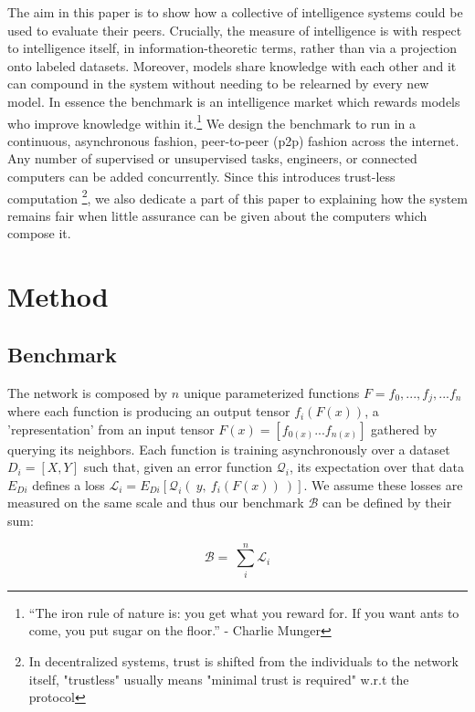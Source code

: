 \documentclass{article}
\begin{document}
The aim in this paper is to show how a collective of intelligence systems could be used to evaluate their peers. Crucially, the measure of intelligence is with respect to intelligence itself, in information-theoretic terms, rather than via a projection onto labeled datasets. Moreover, models share knowledge with each other and it can compound in the system without needing to be relearned by every new model. In essence the benchmark is an intelligence market which rewards models who improve knowledge within it.\footnote{“The iron rule of nature is: you get what you reward for. If you want ants to come, you put sugar on the floor.” - Charlie Munger} We design the benchmark to run in a continuous, asynchronous fashion, peer-to-peer (p2p) fashion across the internet. Any number of supervised or unsupervised tasks, engineers, or connected computers can be added concurrently. Since this introduces trust-less computation \footnote{ In decentralized systems, trust is shifted from the individuals to the network itself, "trustless" usually means "minimal trust is required" w.r.t the protocol}, we also dedicate a part of this paper to explaining how the system remains fair when little assurance can be given about the computers which compose it. 
\smallskip


\section{Method}

\subsection{Benchmark}

The network is composed by $n$ unique parameterized functions $F = {f_0, ...,  f_j, ...f_n}$ where each function is producing an output tensor $f_i(F(x))$, a 'representation' from an input tensor $F(x) = [f_{0(x)} ... f_{n(x)}]$ gathered by querying its neighbors. Each function is training asynchronously over a dataset $D_i=[X,Y]$ such that, given an error function $\mathcal{Q}_i$, its expectation over that data $E_{Di}$ defines a loss $\mathcal{L}_i = E_{Di}[\mathcal{Q}_i( \ y, \ f_i(F(x)) \ )]$. We assume these losses are measured on the same scale and thus our benchmark $\mathcal{B}$ can be defined by their sum:
\bigskip

\begin{equation}
\mathcal{B} = \ \sum_{i}^{n} \mathcal{L}_i 
\end{equation}
\end{document}
